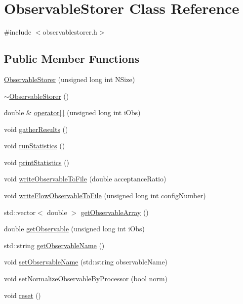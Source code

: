 \hypertarget{class_observable_storer}{}\section{Observable\+Storer Class Reference}
\label{class_observable_storer}


{\ttfamily \#include $<$observablestorer.\+h$>$}

\subsection*{Public Member Functions}
\begin{DoxyCompactItemize}
\item 
\mbox{\hyperlink{class_observable_storer_a12833458c54a15e1abe299d628fc993c}{Observable\+Storer}} (unsigned long int N\+Size)
\item 
\mbox{\hyperlink{class_observable_storer_ac702a77bd6c6c0bff76d7b3959e8f658}{$\sim$\+Observable\+Storer}} ()
\item 
double \& \mbox{\hyperlink{class_observable_storer_a1eae8d9c9b4f9c60facc21a26b3bbb26}{operator\mbox{[}$\,$\mbox{]}}} (unsigned long int i\+Obs)
\item 
void \mbox{\hyperlink{class_observable_storer_a593f13b0dd0f9d20608ef6b84fda3f1d}{gather\+Results}} ()
\item 
void \mbox{\hyperlink{class_observable_storer_a41b3756b423d31c6535d2981ef92d1a1}{run\+Statistics}} ()
\item 
void \mbox{\hyperlink{class_observable_storer_a04a12e7da9e21d6947027230c953bffe}{print\+Statistics}} ()
\item 
void \mbox{\hyperlink{class_observable_storer_a146f9acb8a0a2ce15782d26bdc4f0bf9}{write\+Observable\+To\+File}} (double acceptance\+Ratio)
\item 
void \mbox{\hyperlink{class_observable_storer_af51ebd65eae2a5087cfd47ddf230da93}{write\+Flow\+Observable\+To\+File}} (unsigned long int config\+Number)
\item 
std\+::vector$<$ double $>$ \mbox{\hyperlink{class_observable_storer_ab8885ce7eb3baa3fdb39cda767be6c83}{get\+Observable\+Array}} ()
\item 
double \mbox{\hyperlink{class_observable_storer_af03e1c58c3e0efff251ef9b65cc8d152}{get\+Observable}} (unsigned long int i\+Obs)
\item 
std\+::string \mbox{\hyperlink{class_observable_storer_aa04dd06fe053670f4c8f027aa744277a}{get\+Observable\+Name}} ()
\item 
void \mbox{\hyperlink{class_observable_storer_a7f4847c4fdbf8764d8f07950c4d4b62a}{set\+Observable\+Name}} (std\+::string observable\+Name)
\item 
void \mbox{\hyperlink{class_observable_storer_a6177ade7609fb0e4b739955eecba20e6}{set\+Normalize\+Observable\+By\+Processor}} (bool norm)
\item 
void \mbox{\hyperlink{class_observable_storer_a7b6285a532d796816d75262f91d43dad}{reset}} ()
\end{DoxyCompactItemize}


